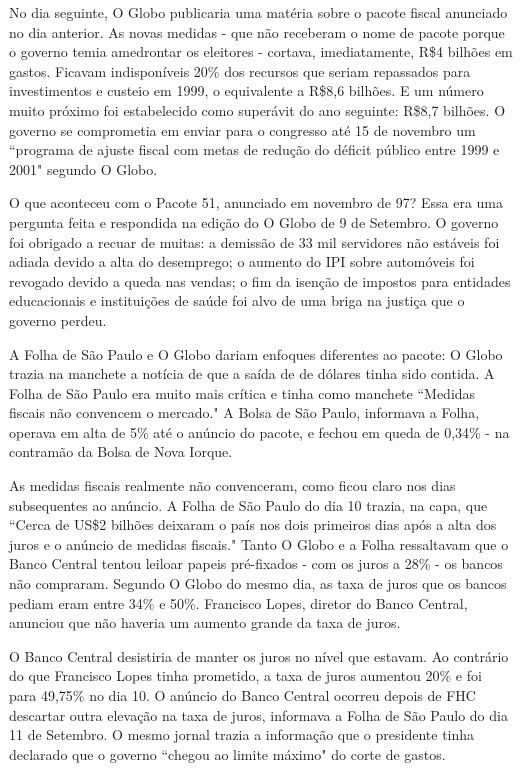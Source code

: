 \documentclass{article}
\begin{document}
No dia seguinte, O Globo publicaria uma matéria sobre o pacote fiscal anunciado no dia anterior. As novas medidas - que não receberam o nome de pacote porque o governo temia amedrontar os eleitores - cortava, imediatamente, R\$4 bilhões em gastos. Ficavam indisponíveis 20\% dos recursos que seriam repassados para investimentos e custeio em 1999, o equivalente a R\$8,6 bilhões. E um número muito próximo foi estabelecido como superávit do ano seguinte: R\$8,7 bilhões. O governo se comprometia em enviar para o congresso até 15 de novembro um ``programa de ajuste fiscal com metas de redução do déficit público entre 1999 e 2001" segundo O Globo.

O que aconteceu com o Pacote 51, anunciado em novembro de 97? Essa era uma pergunta feita e respondida na edição do O Globo de 9 de Setembro. O governo foi obrigado a recuar de muitas: a demissão de 33 mil servidores não estáveis foi adiada devido a alta do desemprego; o aumento do IPI sobre automóveis foi revogado devido a queda nas vendas; o fim da isenção de impostos para entidades educacionais e instituições de saúde foi alvo de uma briga na justiça que o governo perdeu.   

A Folha de São Paulo e O Globo dariam enfoques diferentes ao pacote: O Globo trazia na manchete a notícia de que a saída de de dólares tinha sido contida. A Folha de São Paulo era muito mais crítica e tinha como manchete ``Medidas fiscais não convencem o mercado." A Bolsa de São Paulo, informava a Folha, operava em alta de 5\% até o anúncio do pacote, e fechou em queda de 0,34\% - na contramão da Bolsa de Nova Iorque. 

As medidas fiscais realmente não convenceram, como ficou claro nos dias subsequentes ao anúncio. A Folha de São Paulo do dia 10 trazia, na capa, que ``Cerca de US\$2 bilhões deixaram o país nos dois primeiros dias após a alta dos juros e o anúncio de medidas fiscais." Tanto O Globo e a Folha ressaltavam que o Banco Central tentou leiloar papeis pré-fixados - com os juros a 28\% - os bancos não compraram. Segundo O Globo do mesmo dia, as taxa de juros que os bancos pediam eram entre 34\% e 50\%. Francisco Lopes, diretor do Banco Central, anunciou que não haveria um aumento grande da taxa de juros. 

O Banco Central desistiria de manter os juros no nível que estavam. Ao contrário do que Francisco Lopes tinha prometido, a taxa de juros aumentou 20\% e foi para 49,75\% no dia 10. O anúncio do Banco Central ocorreu depois de FHC descartar outra elevação na taxa de juros, informava a Folha de São Paulo do dia 11 de Setembro. O mesmo jornal trazia a informação que o presidente tinha declarado que o governo ``chegou ao limite máximo" do corte de gastos.       
\end{document}
